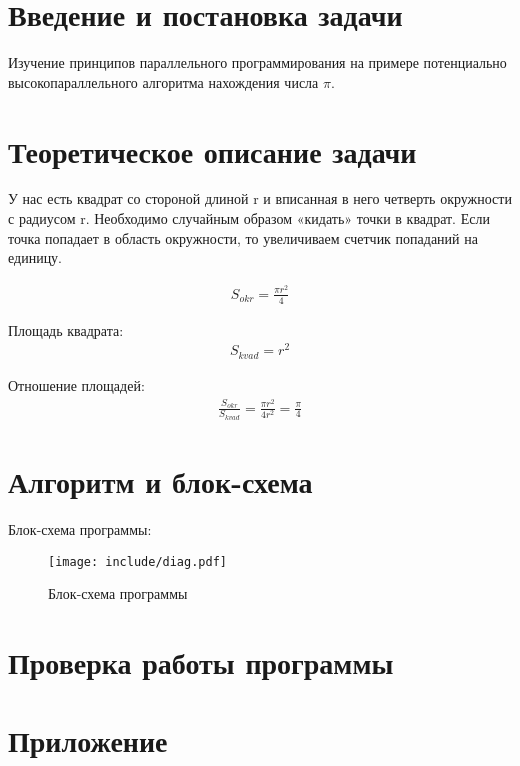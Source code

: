 \documentclass[a4paper,14pt]{extarticle}
\begin{document}
\section{Введение и постановка задачи}
Изучение принципов параллельного программирования на примере потенциально высокопараллельного алгоритма нахождения числа $\pi$.

\section{Теоретическое описание задачи}
У нас есть квадрат со стороной длиной r и вписанная в него четверть окружности с радиусом r. Необходимо случайным образом «кидать» точки в квадрат. Если точка попадает в область окружности, то увеличиваем счетчик попаданий на единицу.

\begin{align*}
S_{okr} = \frac{\pi r^2}{4}
\end{align*}

Площадь квадрата:
\begin{align*}
S_{kvad} = r^2
\end{align*}

Отношение площадей:
\begin{align*}
\frac{S_{okr}}{S_{kvad}} = \frac{\pi r^2}{4r^2} = \frac{\pi}{4}
\end{align*}

\newpage

\section{Алгоритм и блок-схема}			
Блок-схема программы:	
\begin{figure}[H]
	\centering
	\texttt{[image: include/diag.pdf]}
	\caption{Блок-схема программы}
\end{figure}

\newpage

\section{Проверка работы программы}
\newpage

\section*{Приложение}
\inputminted[mathescape,linenos,breaklines]{c++}{../src/main.cpp}
\end{document}
